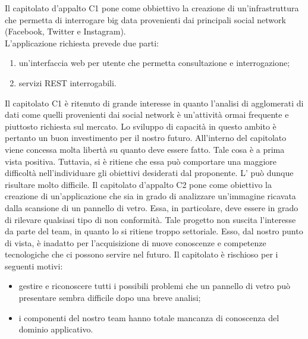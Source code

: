 			Il capitolato d'appalto C1 pone come obbiettivo la creazione di un'infrastruttura che permetta di interrogare big data provenienti dai principali social network (Facebook, Twitter e Instagram).\\
			L'applicazione richiesta prevede due parti:
			\begin{enumerate}
				\item un'interfaccia web per utente che permetta consultazione e interrogazione;
				\item servizi REST interrogabili.
			\end{enumerate}
			Il capitolato C1 è ritenuto di grande interesse in quanto l'analisi di agglomerati di dati come quelli provenienti dai social network è un'attività ormai frequente e piuttosto richiesta sul mercato. Lo sviluppo di capacità in questo ambito è pertanto un buon investimento per il nostro futuro.
		All'interno del capitolato viene concessa molta libertà su quanto deve essere fatto. Tale cosa è a prima vista positiva. Tuttavia, si è ritiene che essa può comportare una maggiore difficoltà nell'individuare gli obiettivi desiderati dal proponente. L' può dunque risultare molto difficile.
			Il capitolato d'appalto C2 pone come obiettivo la creazione di un'applicazione che sia in grado di analizzare un'immagine ricavata dalla scansione di un pannello di vetro. Essa, in particolare, deve essere in grado di rilevare qualsiasi tipo di non conformità.
			Tale progetto non suscita l'interesse da parte del team, in quanto lo si ritiene troppo settoriale. Esso, dal nostro punto di vista, è inadatto per l'acquisizione di nuove conoscenze e competenze tecnologiche che ci possono servire nel futuro.
			Il capitolato è rischioso per i seguenti motivi:
			\begin{itemize}
				\item gestire e riconoscere tutti i possibili problemi che un pannello di vetro può presentare sembra difficile dopo una breve analisi;
				\item i componenti del nostro team hanno totale mancanza di conoscenza del dominio applicativo.
			\end{itemize}
